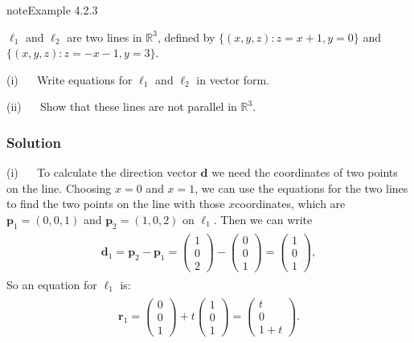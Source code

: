 \documentclass[letterpaper,10pt,english]{jupyterBook}
\begin{document}
\begin{sphinxadmonition}{note}{Example 4.2.3}



\sphinxAtStartPar
\(\ell_1\) and \(\ell_2\) are two lines in \(\mathbb{R}^3\), defined by \(\{(x,y,z) : z = x+1, y=0\}\) and \(\{(x,y,z) : z = -x-1, y=3\}\).

\sphinxAtStartPar
(i)   Write equations for \(\ell_1\) and \(\ell_2\) in vector form.

\sphinxAtStartPar
(ii)   Show that these lines are not parallel in \(\mathbb{R}^3\).
\subsubsection*{Solution}

\sphinxAtStartPar
(i)   To calculate the direction vector \(\mathbf{d}\) we need the coordinates of two points on the line. Choosing \(x=0\) and \(x=1\), we can use the equations for the two lines to find the two points on the line with those \(x\)\sphinxhyphen{}coordinates, which are \(\mathbf{p}_1 = (0, 0, 1)\) and \(\mathbf{p}_2 = (1, 0, 2)\) on \(\ell_1\). Then we can write
\begin{equation*}
\begin{split} \begin{align*}
    \mathbf{d}_1 = \mathbf{p}_2 - \mathbf{p}_1 = \begin{pmatrix} 1 \\ 0 \\ 2 \end{pmatrix} - 
    \begin{pmatrix} 0 \\ 0 \\ 1 \end{pmatrix} =
    \begin{pmatrix} 1 \\ 0 \\ 1 \end{pmatrix},
\end{align*} \end{split}
\end{equation*}
\sphinxAtStartPar
So an equation for \(\ell_1\) is:
\begin{equation*}
\begin{split} \begin{align*}
    \mathbf{r}_1 = \begin{pmatrix} 0 \\ 0 \\ 1 \end{pmatrix} + t \begin{pmatrix} 1 \\ 0 \\ 1 \end{pmatrix} = \begin{pmatrix} t \\ 0 \\ 1 + t \end{pmatrix}.

\end{align*}
\end{split}
\end{equation*}
\end{sphinxadmonition}
\end{document}
